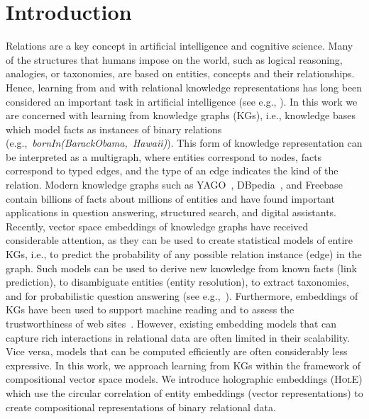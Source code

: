 \documentclass[letterpaper]{article}
\newcommand{\hole}{\textsc{HolE}\xspace}
\begin{document}
\section{Introduction}
Relations are a key concept in artificial intelligence and cognitive science.
Many of the structures that humans impose on the world, such as logical
reasoning, analogies, or taxonomies, are based on entities, concepts and their
relationships. Hence, learning from and with relational knowledge
representations has long been considered an important task in artificial
intelligence (see e.g.,
\cite{getoor:srlbook07,muggleton1991inductive,gentner1983structure,Kemp:2006:LSC:1597538.1597600,Xu06infinitehidden,richardson2006markov}).
In this work we are concerned with learning from knowledge graphs (KGs), i.e.,
knowledge bases which model facts as instances of binary relations
(e.g.,~\mbox{\textit{bornIn(BarackObama, Hawaii)}}). This form of knowledge
representation can be interpreted as a multigraph, where entities
correspond to nodes, facts correspond to typed edges, and the type of an edge
indicates the kind of the relation. Modern knowledge graphs such as
YAGO~\citep{suchanek_yago:_2007}, DBpedia~\citep{auer_dbpedia:_2007}, and
Freebase~\citep{bollacker_freebase:_2008} contain billions of facts about
millions of entities and have found important applications in question
answering, structured search, and digital assistants.
Recently, vector space embeddings of knowledge graphs have received considerable
attention, as they can be used to create statistical models of entire KGs,
i.e., to predict the probability of any possible relation instance
(edge) in the graph. Such models can be used to derive new knowledge from known
facts (link prediction), to disambiguate entities (entity resolution), to
extract taxonomies, and for probabilistic question answering (see
e.g.,~\citep{nickel_three-way_2011,bordes2013translating,krompass2014querying}).
Furthermore, embeddings of KGs have been used to support machine
reading and to assess the trustworthiness of web
sites~\citep{dong2014knowledge,dong2015trust}.
However, existing embedding models that can capture rich interactions in
relational data are often limited in their scalability. Vice versa, models that
can be computed efficiently are often considerably less expressive.
In this work, we approach learning from KGs within the framework of compositional vector
space models. We introduce holographic embeddings (\hole) which use the circular
correlation of entity embeddings (vector representations) to create
compositional representations of binary relational data.
\end{document}
